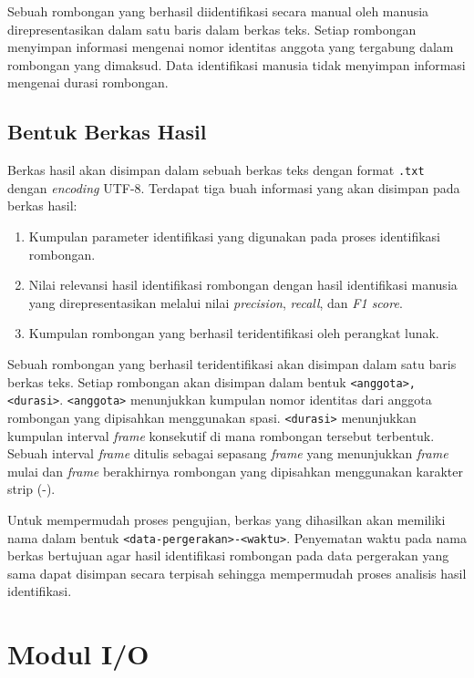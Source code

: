 Sebuah rombongan yang berhasil diidentifikasi secara manual oleh manusia direpresentasikan dalam satu baris dalam berkas teks. Setiap rombongan menyimpan informasi mengenai nomor identitas anggota yang tergabung dalam rombongan yang dimaksud. Data identifikasi manusia tidak menyimpan informasi mengenai durasi rombongan. 

\subsection{Bentuk Berkas Hasil}
\label{sec:result-text}

Berkas hasil akan disimpan dalam sebuah berkas teks dengan format \texttt{.txt} dengan \textit{encoding} UTF-8. Terdapat tiga buah informasi yang akan disimpan pada berkas hasil:

\begin{enumerate}
    \item Kumpulan parameter identifikasi yang digunakan pada proses identifikasi rombongan.
    \item Nilai relevansi hasil identifikasi rombongan dengan hasil identifikasi manusia yang direpresentasikan melalui nilai \textit{precision}, \textit{recall}, dan \textit{F1 score}.
    \item Kumpulan rombongan yang berhasil teridentifikasi oleh perangkat lunak.
\end{enumerate}

Sebuah rombongan yang berhasil teridentifikasi akan disimpan dalam satu baris berkas teks. Setiap rombongan akan disimpan dalam bentuk \texttt{<anggota>, <durasi>}. \texttt{<anggota>} menunjukkan kumpulan nomor identitas dari anggota rombongan yang dipisahkan menggunakan spasi. \texttt{<durasi>} menunjukkan kumpulan interval \textit{frame} konsekutif di mana rombongan tersebut terbentuk. Sebuah interval \textit{frame} ditulis sebagai sepasang \textit{frame} yang menunjukkan \textit{frame} mulai dan \textit{frame} berakhirnya rombongan yang dipisahkan menggunakan karakter strip (-).

Untuk mempermudah proses pengujian, berkas yang dihasilkan akan memiliki nama dalam bentuk \texttt{<data-pergerakan>-<waktu>}. Penyematan waktu pada nama berkas bertujuan agar hasil identifikasi rombongan pada data pergerakan yang sama dapat disimpan secara terpisah sehingga mempermudah proses analisis hasil identifikasi.

\section{Modul I/O}
\label{sec:des-io}

